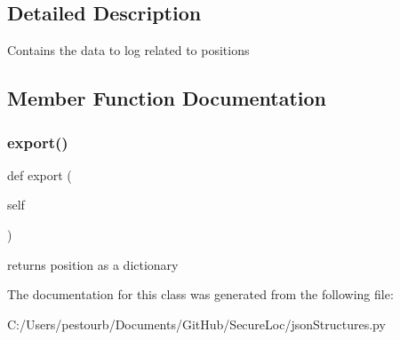 \subsection{Detailed Description}
\begin{DoxyVerb}Contains the data to log related to positions\end{DoxyVerb}
 

\subsection{Member Function Documentation}
\mbox{\label{classjson_structures_1_1position_a68cc2498d25cf6670863c141957ac262}} 
\subsubsection{\texorpdfstring{export()}{export()}}
{\footnotesize\ttfamily def export (\begin{DoxyParamCaption}\item[{}]{self }\end{DoxyParamCaption})}

\begin{DoxyVerb}returns position as a dictionary\end{DoxyVerb}
 

The documentation for this class was generated from the following file\+:\begin{DoxyCompactItemize}
\item 
C\+:/\+Users/pestourb/\+Documents/\+Git\+Hub/\+Secure\+Loc/json\+Structures.\+py\end{DoxyCompactItemize}
